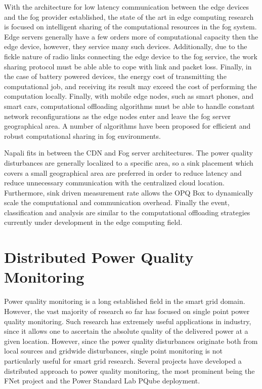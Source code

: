With the architecture for low latency communication between the edge devices and the fog provider established, the state of the art in edge computing research is focused on intelligent sharing of the computational resources in the fog system.
Edge servers generally have a few orders more of computational capacity then the edge device, however, they service many such devices.
Additionally, due to the fickle nature of radio links connecting the edge device to the fog service, the work sharing protocol must be able able to cope with link and packet loss.
Finally, in the case of battery powered devices, the energy cost of transmitting the computational job, and receiving its result may exceed the cost of performing the computation locally.
Finally, with mobile edge nodes, such as smart phones, and smart cars, computational offloading algorithms must be able to handle constant network reconfigurations as the edge nodes enter and leave the fog server geographical area.
A number of algorithms have been proposed for efficient and robust computational sharing in fog environments. \cite{oueis2015fog} \cite{wang2015mobiscud} \cite{wang2013mobile}

Napali fits in between the CDN and Fog server architectures.
The power quality disturbances are generally localized to a specific area, so a sink placement which covers a small geographical area are preferred in order to reduce latency and reduce unnecessary communication with the centralized cloud location.
Furthermore, sink driven measurement rate allows the OPQ Box to dynamically scale the computational and communication overhead.
Finally the event, classification and analysis are similar to the computational offloading strategies currently under development in the edge computing field.

\section{Distributed Power Quality Monitoring}

Power quality monitoring is a long established field in the smart grid domain.
However, the vast majority of research so far has focused on single point power quality monitoring.\cite{silva2017development} Such research has extremely useful applications in industry, since it allows one to ascertain the absolute quality of the delivered power at a given location.
However, since the power quality disturbances originate both from local sources and gridwide disturbances, single point monitoring is not particularly useful for smart grid research.
Several projects have developed a distributed approach to power quality monitoring, the most prominent being the FNet project and the Power Standard Lab PQube deployment.


